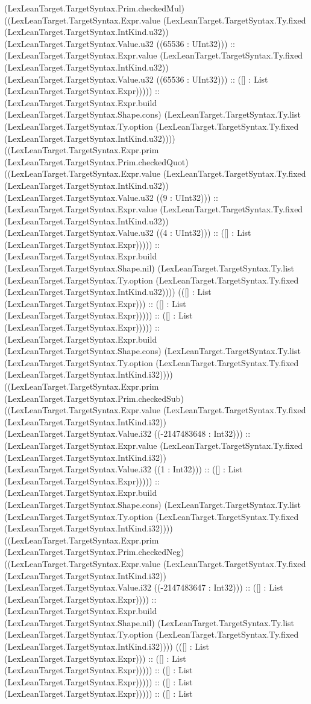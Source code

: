 \documentclass[11pt]{article}
\begin{document}
(LexLeanTarget.TargetSyntax.Prim.checkedMul) ((LexLeanTarget.TargetSyntax.Expr.value (LexLeanTarget.TargetSyntax.Ty.fixed (LexLeanTarget.TargetSyntax.IntKind.u32)) (LexLeanTarget.TargetSyntax.Value.u32 ((65536 : UInt32))) :: (LexLeanTarget.TargetSyntax.Expr.value (LexLeanTarget.TargetSyntax.Ty.fixed (LexLeanTarget.TargetSyntax.IntKind.u32)) (LexLeanTarget.TargetSyntax.Value.u32 ((65536 : UInt32))) :: ([] : List (LexLeanTarget.TargetSyntax.Expr))))) :: (LexLeanTarget.TargetSyntax.Expr.build (LexLeanTarget.TargetSyntax.Shape.cons) (LexLeanTarget.TargetSyntax.Ty.list (LexLeanTarget.TargetSyntax.Ty.option (LexLeanTarget.TargetSyntax.Ty.fixed (LexLeanTarget.TargetSyntax.IntKind.u32)))) ((LexLeanTarget.TargetSyntax.Expr.prim (LexLeanTarget.TargetSyntax.Prim.checkedQuot) ((LexLeanTarget.TargetSyntax.Expr.value (LexLeanTarget.TargetSyntax.Ty.fixed (LexLeanTarget.TargetSyntax.IntKind.u32)) (LexLeanTarget.TargetSyntax.Value.u32 ((9 : UInt32))) :: (LexLeanTarget.TargetSyntax.Expr.value (LexLeanTarget.TargetSyntax.Ty.fixed (LexLeanTarget.TargetSyntax.IntKind.u32)) (LexLeanTarget.TargetSyntax.Value.u32 ((4 : UInt32))) :: ([] : List (LexLeanTarget.TargetSyntax.Expr))))) :: (LexLeanTarget.TargetSyntax.Expr.build (LexLeanTarget.TargetSyntax.Shape.nil) (LexLeanTarget.TargetSyntax.Ty.list (LexLeanTarget.TargetSyntax.Ty.option (LexLeanTarget.TargetSyntax.Ty.fixed (LexLeanTarget.TargetSyntax.IntKind.u32)))) (([] : List (LexLeanTarget.TargetSyntax.Expr))) :: ([] : List (LexLeanTarget.TargetSyntax.Expr))))) :: ([] : List (LexLeanTarget.TargetSyntax.Expr))))) :: (LexLeanTarget.TargetSyntax.Expr.build (LexLeanTarget.TargetSyntax.Shape.cons) (LexLeanTarget.TargetSyntax.Ty.list (LexLeanTarget.TargetSyntax.Ty.option (LexLeanTarget.TargetSyntax.Ty.fixed (LexLeanTarget.TargetSyntax.IntKind.i32)))) ((LexLeanTarget.TargetSyntax.Expr.prim (LexLeanTarget.TargetSyntax.Prim.checkedSub) ((LexLeanTarget.TargetSyntax.Expr.value (LexLeanTarget.TargetSyntax.Ty.fixed (LexLeanTarget.TargetSyntax.IntKind.i32)) (LexLeanTarget.TargetSyntax.Value.i32 ((-2147483648 : Int32))) :: (LexLeanTarget.TargetSyntax.Expr.value (LexLeanTarget.TargetSyntax.Ty.fixed (LexLeanTarget.TargetSyntax.IntKind.i32)) (LexLeanTarget.TargetSyntax.Value.i32 ((1 : Int32))) :: ([] : List (LexLeanTarget.TargetSyntax.Expr))))) :: (LexLeanTarget.TargetSyntax.Expr.build (LexLeanTarget.TargetSyntax.Shape.cons) (LexLeanTarget.TargetSyntax.Ty.list (LexLeanTarget.TargetSyntax.Ty.option (LexLeanTarget.TargetSyntax.Ty.fixed (LexLeanTarget.TargetSyntax.IntKind.i32)))) ((LexLeanTarget.TargetSyntax.Expr.prim (LexLeanTarget.TargetSyntax.Prim.checkedNeg) ((LexLeanTarget.TargetSyntax.Expr.value (LexLeanTarget.TargetSyntax.Ty.fixed (LexLeanTarget.TargetSyntax.IntKind.i32)) (LexLeanTarget.TargetSyntax.Value.i32 ((-2147483647 : Int32))) :: ([] : List (LexLeanTarget.TargetSyntax.Expr)))) :: (LexLeanTarget.TargetSyntax.Expr.build (LexLeanTarget.TargetSyntax.Shape.nil) (LexLeanTarget.TargetSyntax.Ty.list (LexLeanTarget.TargetSyntax.Ty.option (LexLeanTarget.TargetSyntax.Ty.fixed (LexLeanTarget.TargetSyntax.IntKind.i32)))) (([] : List (LexLeanTarget.TargetSyntax.Expr))) :: ([] : List (LexLeanTarget.TargetSyntax.Expr))))) :: ([] : List (LexLeanTarget.TargetSyntax.Expr))))) :: ([] : List (LexLeanTarget.TargetSyntax.Expr))))) :: ([] : List 
\end{document}
